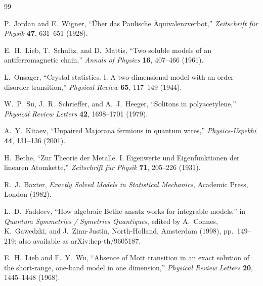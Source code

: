 \documentclass[12pt,openany]{book}
\theoremstyle{definition}
\theoremstyle{plain}
\begin{document}
\begin{thebibliography}{99}


P.~Jordan and E.~Wigner,
``\"Uber das Paulische \"Aquivalenzverbot,''
\emph{Zeitschrift f\"ur Physik} \textbf{47}, 631--651 (1928).

E.~H.~Lieb, T.~Schultz, and D.~Mattis,
``Two soluble models of an antiferromagnetic chain,''
\emph{Annals of Physics} \textbf{16}, 407--466 (1961).

L.~Onsager,
``Crystal statistics. I. A two-dimensional model with an order-disorder
transition,''
\emph{Physical Review} \textbf{65}, 117--149 (1944).

W.~P.~Su, J.~R.~Schrieffer, and A.~J.~Heeger,
``Solitons in polyacetylene,''
\emph{Physical Review Letters} \textbf{42}, 1698--1701 (1979).

A.~Y.~Kitaev,
``Unpaired Majorana fermions in quantum wires,''
\emph{Physics-Uspekhi} \textbf{44}, 131--136 (2001).


H.~Bethe,
``Zur Theorie der Metalle. I. Eigenwerte und Eigenfunktionen der linearen
Atomkette,''
\emph{Zeitschrift f\"ur Physik} \textbf{71}, 205--226 (1931).

R.~J.~Baxter,
\emph{Exactly Solved Models in Statistical Mechanics},
Academic Press, London (1982).

L.~D.~Faddeev,
``How algebraic Bethe ansatz works for integrable models,''
in \emph{Quantum Symmetries / Symetries Quantiques},
edited by A.~Connes, K.~Gawedzki, and J.~Zinn-Justin,
North-Holland, Amsterdam (1998), pp.~149--219;
also available as arXiv:hep-th/9605187.

E.~H.~Lieb and F.~Y.~Wu,
``Absence of Mott transition in an exact solution of the short-range,
one-band model in one dimension,''
\emph{Physical Review Letters} \textbf{20}, 1445--1448 (1968).


\end{thebibliography}
\end{document}

